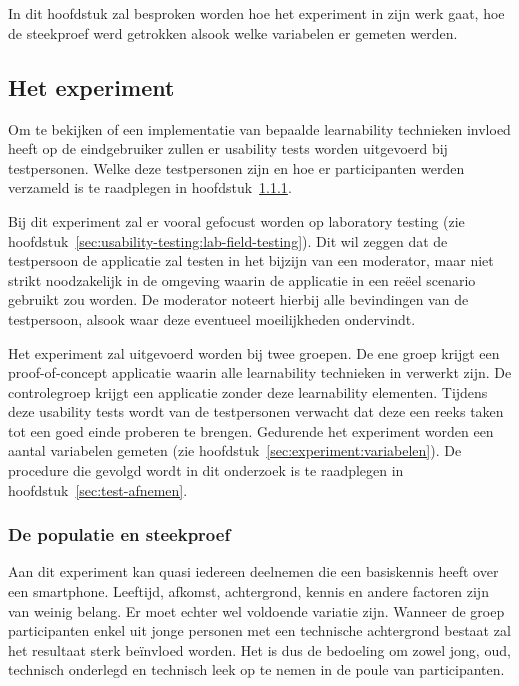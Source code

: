 \chapter{}
\label{ch:methodologie}

In dit hoofdstuk zal besproken worden hoe het experiment in zijn werk gaat, hoe de steekproef werd getrokken alsook welke variabelen er gemeten werden.

\section{Het experiment}
\label{sec:experiment}

Om te bekijken of een implementatie van bepaalde learnability technieken invloed heeft op de eindgebruiker zullen er usability tests worden uitgevoerd bij testpersonen. Welke deze testpersonen zijn en hoe er participanten werden verzameld is te raadplegen in hoofdstuk~\ref{sec:experiment:populatie-steekproef}.

Bij dit experiment zal er vooral gefocust worden op laboratory testing (zie hoofdstuk~\ref{sec:usability-testing:lab-field-testing}). Dit wil zeggen dat de testpersoon de applicatie zal testen in het bijzijn van een moderator, maar niet strikt noodzakelijk in de omgeving waarin de applicatie in een reëel scenario gebruikt zou worden. De moderator noteert hierbij alle bevindingen van de testpersoon, alsook waar deze eventueel moeilijkheden ondervindt.

Het experiment zal uitgevoerd worden bij twee groepen. De ene groep krijgt een proof-of-concept applicatie waarin alle learnability technieken in verwerkt zijn. De controlegroep krijgt een applicatie zonder deze learnability elementen. Tijdens deze usability tests wordt van de testpersonen verwacht dat deze een reeks taken tot een goed einde proberen te brengen. Gedurende het experiment worden een aantal variabelen gemeten (zie hoofdstuk~\ref{sec:experiment:variabelen}). De procedure die gevolgd wordt in dit onderzoek is te raadplegen in hoofdstuk~\ref{sec:test-afnemen}.

\subsection{De populatie en steekproef}
\label{sec:experiment:populatie-steekproef}

Aan dit experiment kan quasi iedereen deelnemen die een basiskennis heeft over een smartphone. Leeftijd, afkomst, achtergrond, kennis en andere factoren zijn van weinig belang. Er moet echter wel voldoende variatie zijn. Wanneer de groep participanten enkel uit jonge personen met een technische achtergrond bestaat zal het resultaat sterk beïnvloed worden. Het is dus de bedoeling om zowel jong, oud, technisch onderlegd en technisch leek op te nemen in de poule van participanten.

